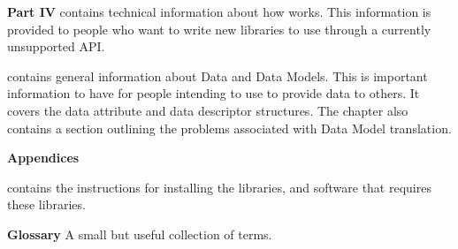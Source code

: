 \begin{description}
\begin{description}
  \end{description}
  
\item{\bf Part IV} contains technical information about how \opendap
  works. This information is provided to people who want to write new
  libraries to use \opendap through a currently unsupported API.

  \begin{description}
    
  \item{\bf{}} contains general information about
    Data and Data Models.  This is important information to have for
    people intending to use \opendap to provide data to others.  It covers
    the \opendap data attribute and data descriptor structures.  The
    chapter also contains a section outlining the problems associated
    with Data Model translation.

  \end{description}

\item{\bf Appendices}

  \begin{description}
    
  \item{\bf{}} contains the instructions for installing
    the \opendap libraries, and software that requires these libraries.

  \item{\bf Glossary} A small but useful collection of terms.

  \end{description}

\end{description}


\listconventions


%
%
%

